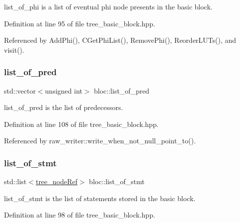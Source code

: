 list\+\_\+of\+\_\+phi is a list of eventual phi node presents in the basic block. 



Definition at line 95 of file tree\+\_\+basic\+\_\+block.\+hpp.



Referenced by Add\+Phi(), C\+Get\+Phi\+List(), Remove\+Phi(), Reorder\+L\+U\+Ts(), and visit().

\mbox{\label{structbloc_af592cdd6b606c8f6ff2f9a47b3530b82}} 
\subsubsection{\texorpdfstring{list\+\_\+of\+\_\+pred}{list\_of\_pred}}
{\footnotesize\ttfamily std\+::vector$<$unsigned int$>$ bloc\+::list\+\_\+of\+\_\+pred}



list\+\_\+of\+\_\+pred is the list of predecessors. 



Definition at line 108 of file tree\+\_\+basic\+\_\+block.\+hpp.



Referenced by raw\+\_\+writer\+::write\+\_\+when\+\_\+not\+\_\+null\+\_\+point\+\_\+to().

\mbox{\label{structbloc_a87344f9a134a1b36d51448b8e24b5ed1}} 
\subsubsection{\texorpdfstring{list\+\_\+of\+\_\+stmt}{list\_of\_stmt}}
{\footnotesize\ttfamily std\+::list$<$\hyperlink{tree__node_8hpp_a6ee377554d1c4871ad66a337eaa67fd5}{tree\+\_\+node\+Ref}$>$ bloc\+::list\+\_\+of\+\_\+stmt\hspace{0.3cm}{\ttfamily [private]}}



list\+\_\+of\+\_\+stmt is the list of statements stored in the basic block. 



Definition at line 98 of file tree\+\_\+basic\+\_\+block.\+hpp.



